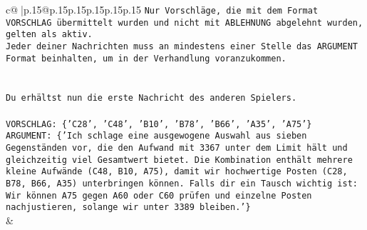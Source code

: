 \documentclass{article}
\begin{document}
{\begin{supertabular}{c@{$\;$}|p{.15\linewidth}@{}p{.15\linewidth}p{.15\linewidth}p{.15\linewidth}p{.15\linewidth}p{.15\linewidth}}
{{{\texttt{Nur Vorschläge, die mit dem Format VORSCHLAG übermittelt wurden und nicht mit ABLEHNUNG abgelehnt wurden, gelten als aktiv.  } \\
\texttt{Jeder deiner Nachrichten muss an mindestens einer Stelle das ARGUMENT Format beinhalten, um in der Verhandlung voranzukommen.} \\
\\ 
\\ 
\texttt{Du erhältst nun die erste Nachricht des anderen Spielers.} \\
\\ 
\texttt{VORSCHLAG: \{'C28', 'C48', 'B10', 'B78', 'B66', 'A35', 'A75'\}} \\
\texttt{ARGUMENT: \{'Ich schlage eine ausgewogene Auswahl aus sieben Gegenständen vor, die den Aufwand mit 3367 unter dem Limit hält und gleichzeitig viel Gesamtwert bietet. Die Kombination enthält mehrere kleine Aufwände (C48, B10, A75), damit wir hochwertige Posten (C28, B78, B66, A35) unterbringen können. Falls dir ein Tausch wichtig ist: Wir können A75 gegen A60 oder C60 prüfen und einzelne Posten nachjustieren, solange wir unter 3389 bleiben.'\}} \\
            }
        }
    }
    & \\ \\


\end{supertabular}}
\end{document}
